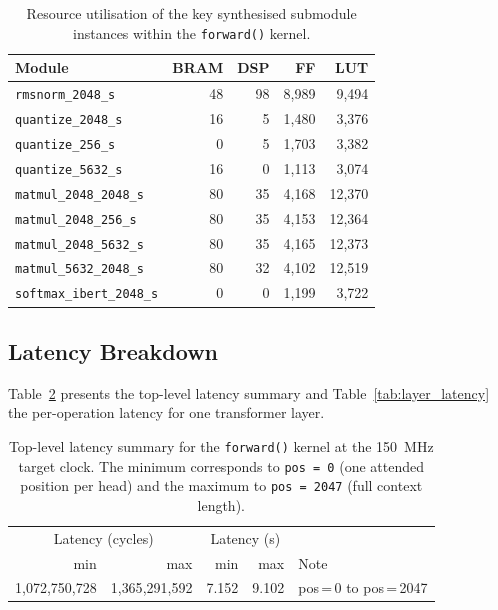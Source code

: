 \begin{table}[H]
  \centering
  \begin{tabular}{lrrrr}
    \toprule
    Module & BRAM & DSP & FF & LUT \\
    \midrule
    \texttt{rmsnorm\_2048\_s}      &  48 &  98 &  8{,}989 &  9{,}494 \\
    \texttt{quantize\_2048\_s}     &  16 &   5 &  1{,}480 &  3{,}376 \\
    \texttt{quantize\_256\_s}      &   0 &   5 &  1{,}703 &  3{,}382 \\
    \texttt{quantize\_5632\_s}     &  16 &   0 &  1{,}113 &  3{,}074 \\
    \texttt{matmul\_2048\_2048\_s} &  80 &  35 &  4{,}168 & 12{,}370 \\
    \texttt{matmul\_2048\_256\_s}  &  80 &  35 &  4{,}153 & 12{,}364 \\
    \texttt{matmul\_2048\_5632\_s} &  80 &  35 &  4{,}165 & 12{,}373 \\
    \texttt{matmul\_5632\_2048\_s} &  80 &  32 &  4{,}102 & 12{,}519 \\
    \texttt{softmax\_ibert\_2048\_s} &  0 &   0 &  1{,}199 &  3{,}722 \\
    \bottomrule
  \end{tabular}
  \caption{Resource utilisation of the key synthesised submodule instances
           within the \texttt{forward()} kernel.}
  \label{tab:submodule_resources}
\end{table}

\subsection{Latency Breakdown}
\label{subsec:latency_breakdown}

Table~\ref{tab:forward_latency} presents the top-level latency summary and
Table~\ref{tab:layer_latency} the per-operation latency for one transformer
layer.

\begin{table}[H]
  \centering
  \begin{tabular}{rrrrl}
    \toprule
    \multicolumn{2}{c}{Latency (cycles)} &
    \multicolumn{2}{c}{Latency (s)} & \\
    min & max & min & max & Note \\
    \midrule
    1{,}072{,}750{,}728 & 1{,}365{,}291{,}592 & 7.152 & 9.102 & pos\,=\,0 to pos\,=\,2047 \\
    \bottomrule
  \end{tabular}
  \caption{Top-level latency summary for the \texttt{forward()} kernel at the
           \SI{150}{\mega\hertz} target clock. The minimum corresponds to
           \texttt{pos\,=\,0} (one attended position per head) and the maximum
           to \texttt{pos\,=\,2047} (full context length).}
  \label{tab:forward_latency}
\end{table}


